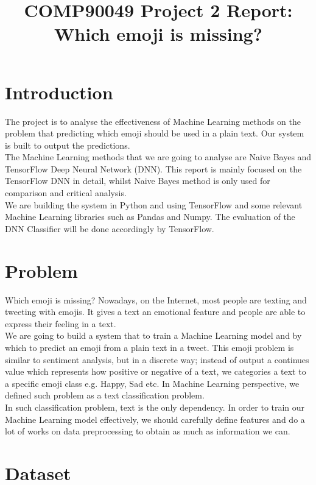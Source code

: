 \documentclass[12pt]{article}
\title{COMP90049 Project 2 Report: Which emoji is missing?}
\begin{document}
\maketitle

\section{Introduction}

The project is to analyse the effectiveness of Machine Learning methods on the problem that predicting which emoji should be used in a plain text. Our system is built to output the predictions.
\medskip \\
The Machine Learning methods that we are going to analyse are Naive Bayes and TensorFlow Deep Neural Network (DNN). This report is mainly focused on the TensorFlow DNN in detail, whilst Naive Bayes method is only used for comparison and critical analysis.
\medskip \\
We are building the system in Python and using TensorFlow and some relevant Machine Learning libraries such as Pandas and Numpy. The evaluation of the DNN Classifier will be done accordingly by TensorFlow.

\section{Problem}

Which emoji is missing? Nowadays, on the Internet, most people are texting and tweeting with emojis. It gives a text an emotional feature and people are able to express their feeling in a text.
\medskip \\
We are going to build a system that to train a Machine Learning model and by which to predict an emoji from a plain text in a tweet. This emoji problem is similar to sentiment analysis, but in a discrete way; instead of output a continues value which represents how positive or negative of a text, we categories a text to a specific emoji class e.g. Happy, Sad etc. In Machine Learning perspective, we defined such problem as a text classification problem.
\medskip \\
In such classification problem, text is the only dependency. In order to train our Machine Learning model effectively, we should carefully define features and do a lot of works on data preprocessing to obtain as much as information we can. 

\section{Dataset}
\end{document}
